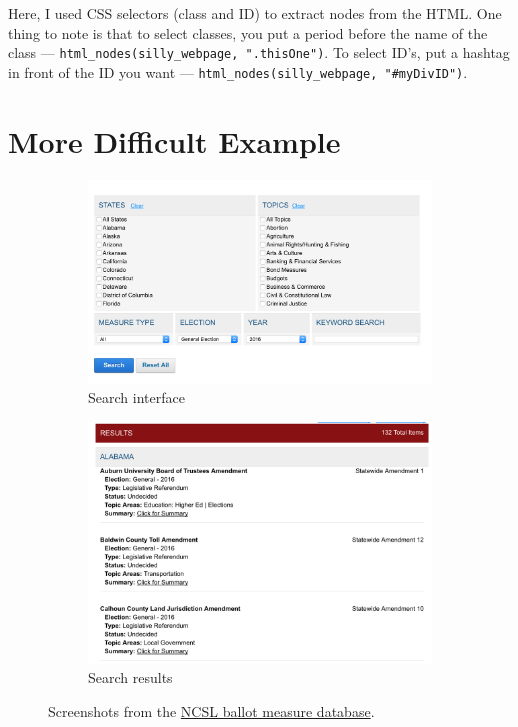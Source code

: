 \documentclass{article}\usepackage[]{graphicx}\usepackage[]{color}
\begin{document}
Here, I used CSS selectors (class and ID) to extract nodes from the HTML. One thing to note is that to select classes, you put a period before the name of the class --- \verb!html_nodes(silly_webpage, ".thisOne")!. To select ID's, put a hashtag in front of the ID you want --- \verb!html_nodes(silly_webpage, "#myDivID")!. 

\section{More Difficult Example}

\begin{figure}[!t]
  \centering
  \begin{subfigure}[b]{.5\textwidth}
    \centering
    \includegraphics[width=.9\textwidth]{ncsl_database.png}\caption{Search interface}
  \end{subfigure}%
  \begin{subfigure}[b]{.5\textwidth}
    \centering
    \includegraphics[width=.9\textwidth]{ncsl_results.png}\caption{Search results}
  \end{subfigure}
  \caption{Screenshots from the \href{http://www.ncsl.org/research/elections-and-campaigns/ballot-measures-database.aspx}{NCSL ballot measure database}.}\label{fig:ncsl}
\end{figure}
\end{document}
